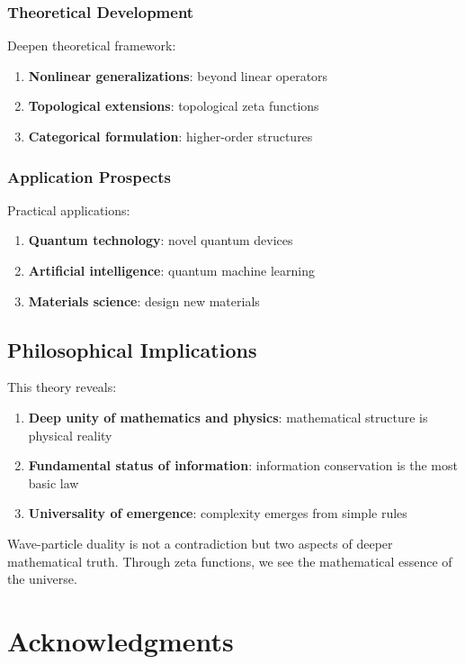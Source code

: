 \documentclass[11pt]{article}
\theoremstyle{plain}
\theoremstyle{definition}
\theoremstyle{remark}
\begin{document}
\subsubsection{Theoretical Development}

Deepen theoretical framework:
\begin{enumerate}
\item \textbf{Nonlinear generalizations}: beyond linear operators
\item \textbf{Topological extensions}: topological zeta functions
\item \textbf{Categorical formulation}: higher-order structures
\end{enumerate}

\subsubsection{Application Prospects}

Practical applications:
\begin{enumerate}
\item \textbf{Quantum technology}: novel quantum devices
\item \textbf{Artificial intelligence}: quantum machine learning
\item \textbf{Materials science}: design new materials
\end{enumerate}

\subsection{Philosophical Implications}

This theory reveals:
\begin{enumerate}
\item \textbf{Deep unity of mathematics and physics}: mathematical structure is physical reality
\item \textbf{Fundamental status of information}: information conservation is the most basic law
\item \textbf{Universality of emergence}: complexity emerges from simple rules
\end{enumerate}

Wave-particle duality is not a contradiction but two aspects of deeper mathematical truth. Through zeta functions, we see the mathematical essence of the universe.

\section*{Acknowledgments}
\end{document}
